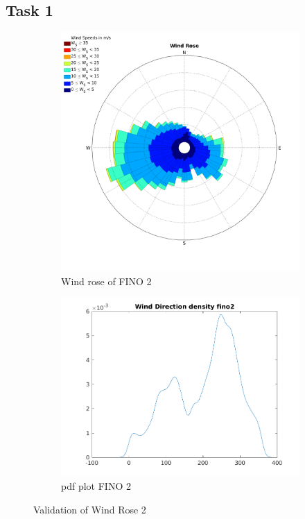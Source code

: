 \documentclass[10pt]{article}
\begin{document}
\subsection{Task 1}
\begin{figure}[htb!]
\begin{subfigure}{0.5\textwidth}
  \centering
  \includegraphics[width=1\linewidth]{../figures/WindRose_Fino2.png}
  \caption{Wind rose of FINO 2}
\end{subfigure}
\begin{subfigure}{0.5\textwidth}
  \centering
  \includegraphics[width=1\linewidth]{../figures/Validation_WindRose_Fino2.png}
  \caption{pdf plot FINO 2}
\end{subfigure}
  \caption{Validation of Wind Rose 2}
\label{fig:WindroseValidation2}
\end{figure}
\end{document}
